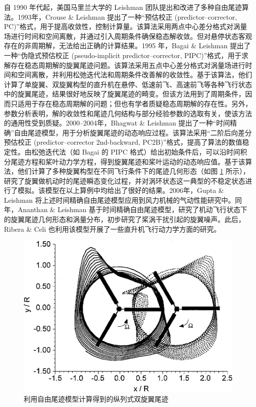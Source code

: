 自 1990 年代起，美国马里兰大学的 Leishman 团队提出和改进了多种自由尾迹算法。1993年，Crouse \& Leishman
提出了一种“预估校正 (predictor–corrector, PC)”格式，用于提高收敛性，控制计算量。该算法采用两点中心差分格式对涡量场进行时间和空间离散，并通过引入周期条件确保稳态解收敛。但对悬停状态客观存在的非周期解，无法给出正确的计算结果。1995
年，Bagai \& Leishman 提出了一种“伪隐式预估校正
(pseudo-implicit predictor–corrector, PIPC)”格式，用于求解存在稳态周期解的旋翼尾迹问题。该算法采用五点中心差分格式对涡量场进行时间和空间离散，并利用松弛迭代法和周期条件改善解的收敛性。基于该算法，他们计算了单旋翼、双旋翼构型的直升机在悬停、低速前飞、高速前飞等各种飞行状态中的旋翼尾迹，结果很好地反映了旋翼尾迹的畸变。但该方法用到了周期条件，因而只适用于存在稳态周期解的问题；但也有学者质疑稳态周期解的存在性。另外，参数分析表明，解的收敛性和尾迹几何结构与部分经验参数的选取有关，使该方法的通用性受到质疑。2000–2004年，Bhagwat
\& Leishman
提出了一种“时间精确”自由尾迹模型，用于分析旋翼尾迹的动态响应过程。该算法采用“二阶后向差分预估校正 (predictor–corrector
2nd-backward, PC2B)”格式，提高了算法的数值稳定性。由松弛迭代法（如 Bagai 的 PIPC 格式）给出初始条件后，可以沿时间积分尾迹方程和桨叶动力学方程，得到旋翼尾迹和桨叶运动的动态响应值。基于该算法，他们计算了多种旋翼构型在不同飞行条件下的尾迹几何形态（如图
\ref{fig:free-wake} 所示），研究了旋翼做机动时的尾迹瞬态变化过程，并对涡环状态这一典型的不稳定状态进行了模拟。该模型在以上算例中均给出了很好的结果。2006年，Gupta
\& Leishman 将上述时间精确自由尾迹模型应用到风力机械的气动性能研究中。同年，Ananthan
\& Leishman 基于时间精确自由尾迹模型，研究了机动飞行状态下的旋翼尾迹几何形态和涡量分布，初步研究了桨涡干扰引起的旋翼噪声。此后，Ribera
\& Celi 也利用该模型开展了一些直升机飞行动力学方面的研究。
\begin{figure}[h!]
\centering{}\includegraphics[width=1\textwidth,height=0.26\textheight,keepaspectratio]{../review/figures/free-wake}
\caption{\label{fig:free-wake}利用自由尾迹模型计算得到的纵列式双旋翼尾迹}
\end{figure}


